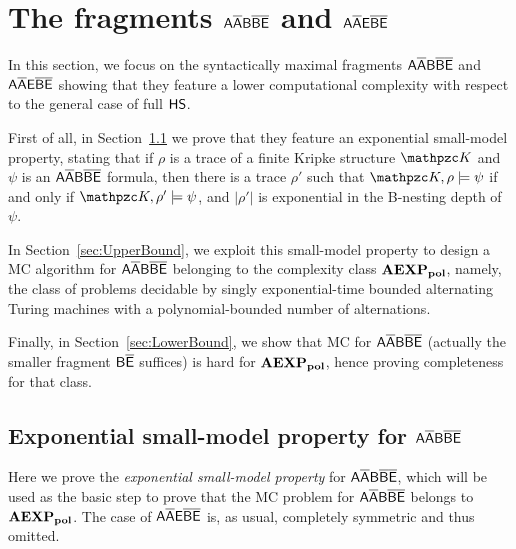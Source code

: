 \section{The fragments $\mathsf{A\overline{A}B\overline{B}\overline{E}}$ and $\mathsf{A\overline{A}E\overline{B}\overline{E}}$}
\label{sec:AAbarBBbarEbarRegex}
In this section, we focus on the syntactically maximal fragments $\mathsf{A\overline{A}B\overline{B}\overline{E}}$ and $\mathsf{A\overline{A}E\overline{B}\overline{E}}$ showing that they feature  a lower computational complexity with respect to the general case of full $\text{\sffamily HS}$.
 
First of all, in Section~\ref{sec:AAbarBBbarEbarTrackProperty}  we prove that they feature an exponential small-model property, stating that
if $\rho$ is a trace of a finite Kripke structure $\Ku$ and  $\psi$ is an $\mathsf{A\overline{A}B\overline{B}\overline{E}}$ formula, then there is a trace $\rho'$ such that $\Ku,\rho\models \psi$ if and only if $\Ku,\rho'\models \psi$, and $|\rho'|$ is exponential in the B-nesting depth of  $\psi$.

In Section~\ref{sec:UpperBound}, we exploit this small-model property to design a MC algorithm for $\mathsf{A\overline{A}B\overline{B}\overline{E}}$  belonging to the complexity class $\mathbf{AEXP_{pol}}$, namely, the class of problems decidable by singly exponential-time bounded alternating Turing machines  with a polynomial-bounded number of alternations.

Finally, in Section~\ref{sec:LowerBound}, we show that MC for $\mathsf{A\overline{A}B\overline{B}\overline{E}}$ (actually the smaller fragment $\mathsf{B\overline{E}}$ suffices)
is hard for $\mathbf{AEXP_{pol}}$, hence proving completeness for that class.

\subsection{Exponential small-model property for $\mathsf{A\overline{A}B\overline{B}\overline{E}}$}\label{sec:AAbarBBbarEbarTrackProperty}
Here we prove the \emph{exponential small-model property} for $\mathsf{A\overline{A}B\overline{B}\overline{E}}$, which will be used as the basic step to prove that the MC problem for $\mathsf{A\overline{A}B\overline{B}\overline{E}}$  belongs to $\mathbf{AEXP_{pol}}$.
The case of $\mathsf{A\overline{A}E\overline{B}\overline{E}}$ is, as usual, completely symmetric and thus omitted.

